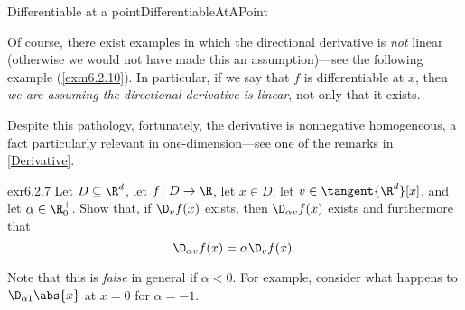 \begin{dfn}{Differentiable at a point}{DifferentiableAtAPoint}
\begin{wrn}
\end{wrn}
\begin{rmk}
Of course, there exist examples in which the directional derivative is \emph{not} linear (otherwise we would not have made this an assumption)---see the following example (\cref{exm6.2.10}).  In particular, if we say that $f$ is differentiable at $x$, then \emph{we are assuming the directional derivative is linear}, not only that it exists.

Despite this pathology, fortunately, the derivative is nonnegative homogeneous, a fact particularly relevant in one-dimension---see one of the remarks in \cref{Derivative}.
\end{rmk}
\begin{exr}[breakable=false]{}{exr6.2.7}
Let $D\subseteq \R ^d$, let $f\colon D\rightarrow \R$, let $x\in D$, let $v\in \tangent{\R ^d}[x]$, and let $\alpha \in \R _0^+$.  Show that, if $\D _vf(x)$ exists, then $\D _{\alpha v}f(x)$ exists and furthermore that
\begin{equation}
\D _{\alpha v}f(x)=\alpha \D _vf(x).
\end{equation}
\begin{rmk}
Note that this is \emph{false} in general if $\alpha <0$.  For example, consider what happens to $\D _{\alpha 1}\abs{x}$ at $x=0$ for $\alpha =-1$.
\end{rmk}
\end{exr}
\end{dfn}
